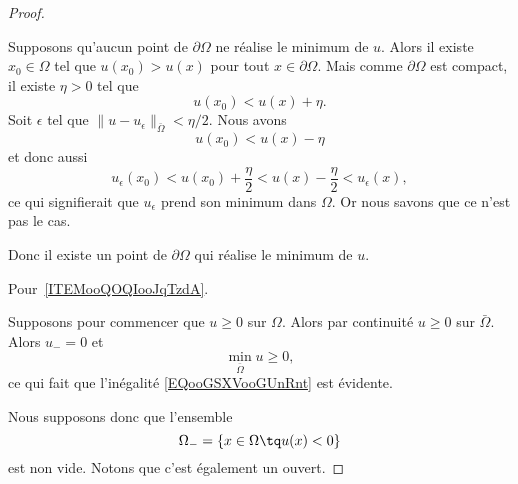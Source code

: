 \begin{proof}
\begin{subproof}
            Supposons qu'aucun point de \( \partial \Omega\) ne réalise le minimum de \( u\). Alors il existe \( x_0\in \Omega\) tel que \( u(x_0)>u(x)\) pour tout \( x\in \partial \Omega\). Mais comme \( \partial\Omega\) est compact, il existe \( \eta>0\) tel que
            \begin{equation}
                u(x_0)<u(x)+\eta.
            \end{equation}
            Soit \( \epsilon\) tel que \( \| u-u_{\epsilon} \|_{\bar \Omega}< \eta/2\). Nous avons
            \begin{equation}
                u(x_0)<u(x)-\eta
            \end{equation}
            et donc aussi
            \begin{equation}
                u_{\epsilon}(x_0)<u(x_0)+\frac{ \eta }{2}<u(x)-\frac{ \eta }{2}<u_{\epsilon}(x),
            \end{equation}
            ce qui signifierait que \( u_{\epsilon}\) prend son minimum dans \( \Omega\). Or nous savons que ce n'est pas le cas.

            Donc il existe un point de \( \partial\Omega\) qui réalise le minimum de \( u\).

    \end{subproof}

    Pour~\ref{ITEMooQOQIooJqTzdA}.

    Supposons pour commencer que \( u\geq 0\) sur \( \Omega\). Alors par continuité \( u\geq 0\) sur \( \bar \Omega\). Alors \( u_-=0\) et
    \begin{equation}
        \min_{\bar\Omega}u\geq 0,
    \end{equation}
    ce qui fait que l'inégalité \eqref{EQooGSXVooGUnRnt} est évidente.

    Nous supposons donc que l'ensemble
    \begin{equation}
        \Omega_-=\{ x\in \Omega\tq u(x)<0 \}
    \end{equation}
    est non vide. Notons que c'est également un ouvert.


\end{proof}
